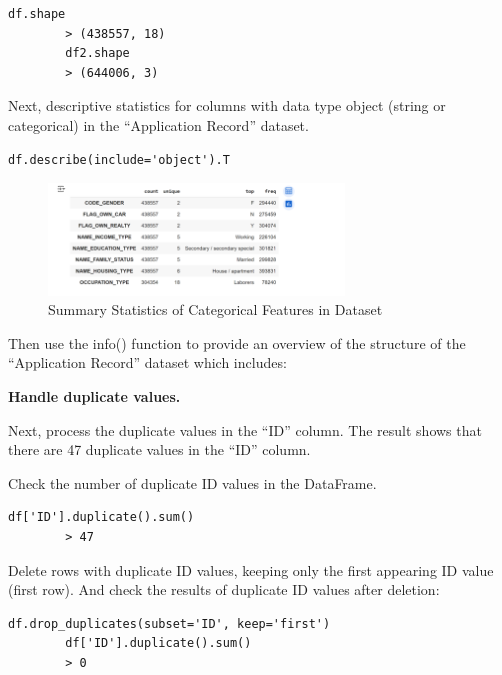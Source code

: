 \documentclass[12pt]{report}
\begin{document}
    \begin{lstlisting}[style=default, language=python*, gobble=3]
        df.shape
        > (438557, 18)
        df2.shape
        > (644006, 3)
    \end{lstlisting}

    Next, descriptive statistics for columns with data type object (string or categorical) in the “Application Record” dataset.

    \begin{lstlisting}[style=default, language=python*, gobble=3]
        df.describe(include='object').T
    \end{lstlisting}

    \begin{figure}[h!]
        \centering
        \includegraphics[width=0.7\textwidth]{resources/pic/Summary Statistics of Categorical Features in Dataset.png}
        \caption{Summary Statistics of Categorical Features in Dataset}
        \label{fig:Summary Statistics of Categorical Features in Dataset}
    \end{figure}

    Then use the info() function to provide an overview of the structure of the “Application Record” dataset which includes:
    
    {\bfseries Handle duplicate values.}
    
    Next, process the duplicate values in the “ID” column. The result shows that there are 47 duplicate values in the “ID” column.
    
    Check the number of duplicate ID values in the DataFrame.

    \begin{lstlisting}[style=default, language=python*, gobble=3]
        df['ID'].duplicate().sum()
        > 47
    \end{lstlisting}

    Delete rows with duplicate ID values, keeping only the first appearing ID value (first row). And check the results of duplicate ID values after deletion:

    \begin{lstlisting}[style=default, language=python*, gobble=3]
        df.drop_duplicates(subset='ID', keep='first')
        df['ID'].duplicate().sum()
        > 0
    \end{lstlisting}
\end{document}
